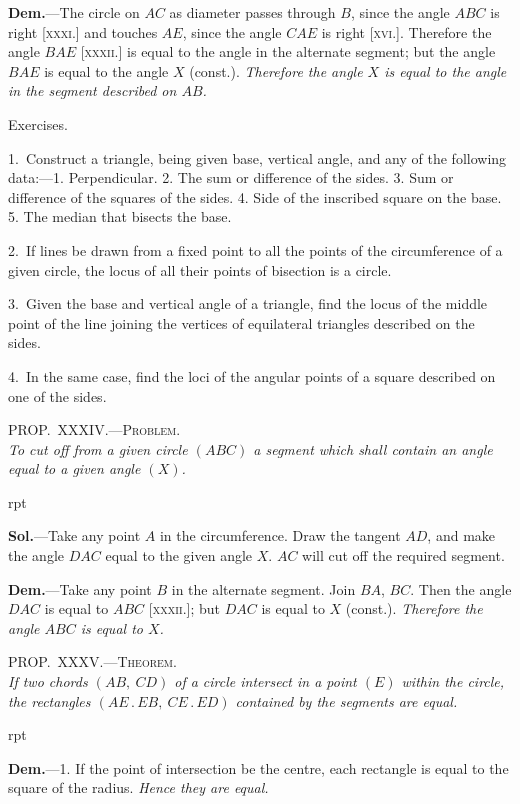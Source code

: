 \documentclass[oneside]{book}
\newcommand\myprop[2]{
\bigskip\Needspace*{4\baselineskip}\begin{center}\textsc{#1}\\\medskip\emph{#2}\par\end{center}
}
\newcommand\exhead[1]{
\Needspace*{5\baselineskip}\begin{center}
\textsf{#1}
\end{center}
}
\newcommand\imgflow[3]{
\setcounter{wrapwidth}{#1}
\begin{wrapfigure}[#2]{r}{\value{wrapwidth}pt}
\begin{center}
\vspace{-0.3in}
\end{center}
\end{wrapfigure}
}
\begin{document}
\textbf{Dem.}---The circle on $AC$ as diameter passes through
$B$, since the angle $ABC$ is right [\textsc{xxxi.}] and touches
$AE$, since the angle $CAE$ is right [\textsc{xvi.}]. Therefore
the angle $BAE$ [\textsc{xxxii.}] is equal to the angle in the
alternate segment; but the angle $BAE$ is equal to the
angle $X$ (const.). \emph{Therefore the angle $X$ is equal to
the angle in the segment described on $AB$.}

\exhead{Exercises.}

\begin{footnotesize}
1.~Construct a triangle, being given base, vertical angle, and
any of the following data:---1. Perpendicular. 2. The sum or
difference of the sides. 3. Sum or difference of the squares of
the sides. 4. Side of the inscribed square on the base. 5. The
median that bisects the base.

2.~If lines be drawn from a fixed point to all the points of the
circumference of a given circle, the locus of all their points of
bisection is a circle.

3.~Given the base and vertical angle of a triangle, find the
locus of the middle point of the line joining the vertices of
equilateral triangles described on the sides.

4.~In the same case, find the loci of the angular points of a
square described on one of the sides.
\par\end{footnotesize}

\myprop{PROP\@.~XXXIV\@.---Problem.}{To cut off from a given circle $(ABC)$ a segment which
shall contain an angle equal to a given angle $(X)$.}

\imgflow{140}{9}{f142}

\textbf{Sol.}---Take any point $A$ in the circumference. Draw
the tangent $AD$, and make the
angle $DAC$ equal to the given
angle $X$. $AC$ will cut off the
required segment.

\textbf{Dem.}---Take any point $B$
in the alternate segment.
Join $BA$, $BC$. Then the
angle $DAC$ is equal to $ABC$
[\textsc{xxxii.}]; but $DAC$ is equal
to $X$ (const.). \emph{Therefore the angle $ABC$ is equal to $X$.}

\myprop{PROP\@.~XXXV\@.---Theorem.}{If two chords $(AB,\ CD)$ of a circle intersect in a point
$(E)$ within the circle, the rectangles $(AE\,.\,EB,\ CE\,.\,ED)$
contained by the segments are equal.}

\imgflow{115}{9}{f143}

\textbf{Dem.}---1. If the point of intersection be the centre,
each rectangle is equal to the square of the radius.
\emph{Hence they are equal.}
\end{document}
